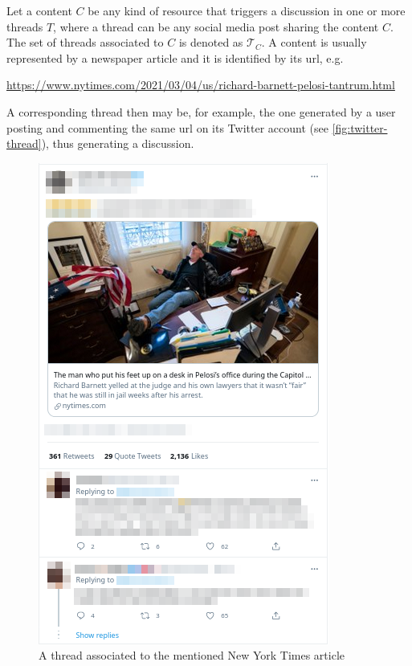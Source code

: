 


Let a content $C$ be any kind of resource that triggers a discussion in one or
more threads $T$, where a thread can be any social media post sharing the content $C$. The set of threads associated to $C$ is denoted as
$\mathcal{T}_{C} $. A content is usually represented by a newspaper article and
it is identified by its url, e.g.

	{\footnotesize
		\begin{center}
			\url{https://www.nytimes.com/2021/03/04/us/richard-barnett-pelosi-tantrum.html}
		\end{center}
	}

A corresponding thread then may be, for example, the one generated by a user
posting and commenting the same url on its Twitter account (see
\autoref{fig:twitter-thread}), thus generating a discussion.

\begin{figure}
	\centering
	\includegraphics[width=0.6\linewidth]{tex/img/twitter_thread.png}
	\caption[Thread-content distinction example from Twitter]{A thread associated to the mentioned New York Times article}%
	\label{fig:twitter-thread}
\end{figure}

